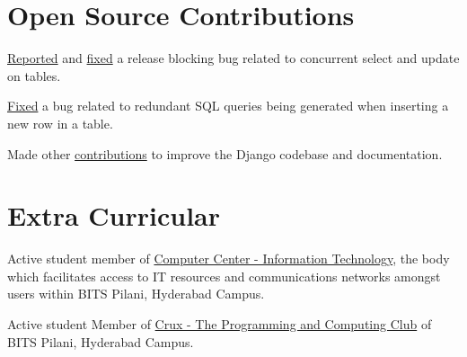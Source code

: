 \documentclass[]{abhijeet_viswa-deedy-resume-openfont}
\begin{document}
\begin{minipage}[t]{0.70\textwidth}
\section{Open Source Contributions}
\begin{tightemize}
\item \href{https://code.djangoproject.com/ticket/31246}{Reported} and \href{https://github.com/django/django/pull/12434}{fixed}
a release blocking bug related to concurrent select and update on tables.
\item \justifying\href{https://github.com/django/django/pull/12496}{Fixed} a bug related to redundant SQL queries being generated when
inserting a new row in a table.
\item \justifying Made other \href{https://github.com/django/django/pulls?q=author\%3Aabhijeetviswa}{contributions} to improve the Django codebase and
documentation.
\end{tightemize}
\primarysectionsep

\subsectionsep %
\section{Extra Curricular}
\vspace{\itemsep}
\begin{tightemize}
\item Active student member of \href{https://universe.bits-pilani.ac.in/Hyderabad/Computercentre}{Computer Center - Information Technology},
the body which facilitates access to IT resources and communications networks amongst users within BITS Pilani, Hyderabad Campus.
\item Active student Member of \href{https://crux-bphc.github.io}{Crux - The Programming and Computing Club} of BITS Pilani, Hyderabad Campus.
\end{tightemize}
\end{minipage}
\end{document}
